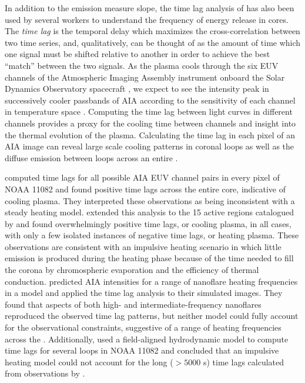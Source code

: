 In addition to the emission measure slope, the time lag analysis of \citet{viall_evidence_2012} has also been used by several workers to understand the frequency of energy release in \AR{} cores. The \textit{time lag} is the temporal delay which maximizes the cross-correlation between two time series, and, qualitatively, can be thought of as the amount of time which one signal must be shifted relative to another in order to achieve the best ``match'' between the two signals. As the plasma cools through the six EUV channels of the Atmospheric Imaging Assembly instrument \citep[AIA,][]{lemen_atmospheric_2012} onboard the Solar Dynamics Observatory spacecraft \citep[SDO,][]{pesnell_solar_2012}, we expect to see the intensity peak in successively cooler passbands of AIA according to the sensitivity of each channel in temperature space \citep{viall_patterns_2011}. Computing the time lag between light curves in different channels provides a proxy for the cooling time between channels and insight into the thermal evolution of the plasma. Calculating the time lag in each pixel of an AIA image can reveal large scale cooling patterns in coronal loops as well as the diffuse emission between loops across an entire \AR{}.

\citet{viall_evidence_2012} computed time lags for all possible AIA EUV channel pairs in every pixel of \AR{} NOAA 11082 and found positive time lags across the entire \AR{} core, indicative of cooling plasma. They interpreted these observations as being inconsistent with a steady heating model. \citet{viall_survey_2017} extended this analysis to the 15 active regions catalogued by \citet{warren_systematic_2012} and found overwhelmingly positive time lags, or cooling plasma, in all cases, with only a few isolated instances of negative time lags, or heating plasma. These observations are consistent with an impulsive heating scenario in which little emission is produced during the heating phase because of the time needed to fill the corona by chromospheric evaporation and the efficiency of thermal conduction. \citet{bradshaw_patterns_2016} predicted AIA intensities for a range of nanoflare heating frequencies in a model \AR{} and applied the time lag analysis to their simulated images. They found that aspects of both high- and intermediate-frequency nanoflares reproduced the observed time lag patterns, but neither model could fully account for the observational constraints, suggestive of a range of heating frequencies across the \AR{}. Additionally, \citet{lionello_can_2016} used a field-aligned hydrodynamic model to compute time lags for several loops in NOAA 11082 and concluded that an impulsive heating model could not account for the long ($>5000$ s) time lags calculated from observations by \citet{viall_evidence_2012}.

